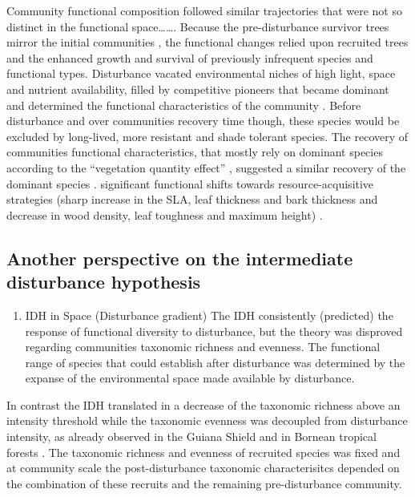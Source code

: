 \documentclass[fleqn,10pt]{ArtEcoFoG} %
\providecommand{\tightlist}{%
  \setlength{\itemsep}{0pt}\setlength{\parskip}{0pt}}
\begin{document}
Community functional composition followed similar trajectories that were
not so distinct in the functional space\ldots{}\ldots{}. Because the
pre-disturbance survivor trees mirror the initial communities
\citep{Herault2018}, the functional changes relied upon recruited trees
and the enhanced growth and survival of previously infrequent species
and functional types. Disturbance vacated environmental niches of high
light, space and nutrient availability, filled by competitive pioneers
that became dominant and determined the functional characteristics of
the community \citep{Grime1998}. Before disturbance and over communities
recovery time though, these species would be excluded by long-lived,
more resistant and shade tolerant species. The recovery of communities
functional characteristics, that mostly rely on dominant species
according to the ``vegetation quantity effect'' \citep{Grime1998},
suggested a similar recovery of the dominant species \citep{Molino2001}.
significant functional shifts towards resource-acquisitive strategies
(sharp increase in the SLA, leaf thickness and bark thickness and
decrease in wood density, leaf toughness and maximum height)
\citep{Westoby1998, Wright2004, Reich2014}.

\subsection{Another perspective on the intermediate disturbance
hypothesis}\label{another-perspective-on-the-intermediate-disturbance-hypothesis}

\begin{enumerate}
\def\labelenumi{\arabic{enumi}.}
\tightlist
\item
  IDH in Space (Disturbance gradient) The IDH consistently (predicted)
  the response of functional diversity to disturbance, but the theory
  was disproved regarding communities taxonomic richness and evenness.
  The functional range of species that could establish after disturbance
  was determined by the expanse of the environmental space made
  available by disturbance.
\end{enumerate}

In contrast the IDH translated in a decrease of the taxonomic richness
above an intensity threshold while the taxonomic evenness was decoupled
from disturbance intensity, as already observed in the Guiana Shield
\citep{Baraloto2012a} and in Bornean tropical forests
\citep{Cannon1998}. The taxonomic richness and evenness of recruited
species was fixed and at community scale the post-disturbance taxonomic
characterisitcs depended on the combination of these recruits and the
remaining pre-disturbance community.
\end{document}

